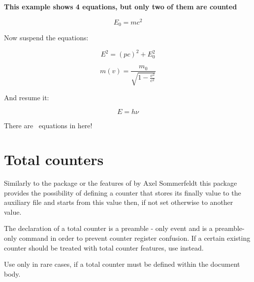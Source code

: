 \documentclass[12pt,a4paper,oneside]{article}
\renewcommand{\tcbdocnew}[1]{#1}%
\begin{document}
\setcounter{totalequations}{0}
\setcounter{equation}{0}
\renewcommand{\DeclareAssociatedCounters}[3][]{\relax}%
\begin{dispExample}
\textbf{This example shows 4 equations, but only two of them are counted}

\begin{equation}
E_{0} = mc^2
\end{equation}

Now suspend the equations:

\begin{equation}
E^2 = \left({ pc}\right)^2 + E^{2}_{0}
\end{equation}

\begin{equation}
  m(v) = \frac{m_{0}}{\sqrt{1-\frac{v^2}{c^2}}} 
\end{equation}

And resume it: 

\begin{equation}
  E = h \nu
\end{equation}

There are \number{}~equations in here!

\end{dispExample}









\section{Total counters}\tcbdocmarginnote{\tcbdocnew{2015-11-27}}\label{sec::totalcounters}



Similarly to the package  or the features of  by Axel Sommerfeldt this package provides the possibility of defining a counter that stores its finally value to the auxiliary file and starts from this value then, if not set otherwise to another value. 

The declaration of a total counter is a preamble - only event and  is a preamble-only command in order to prevent counter register confusion. If a certain existing counter should be treated with total counter features, use  instead.  

Use  only in rare cases, if a total counter must be defined within the document body. 
\end{document}
